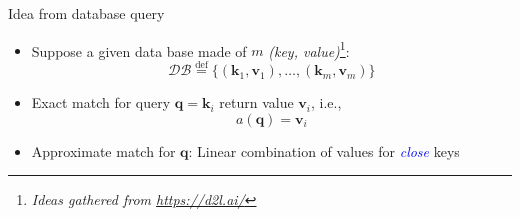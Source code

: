 \documentclass[pressentation,10pt,aspectratio=169,xcolor=table, colorlinks=true]{beamer}
\begin{document}
\begin{frame}[fragile]{Idea from database query}
  \begin{itemize}
  \item Suppose a given data base made of \(m\) \emph{(key, value)}\footnote{  \emph{Ideas gathered from \href{https://d2l.ai/chapter_attention-mechanisms-and-transformers/index.html}{https://d2l.ai/}}}:
    \[\mathcal{DB} \stackrel{\textrm{def}}{=} \big\{(\mathbf{k}_1, \mathbf{v}_1), \ldots, (\mathbf{k}_m, \mathbf{v}_m)\big\}\]

  \item Exact match for query \(\mathbf{q} = \mathbf{k}_i\) return value \(\mathbf{v}_i\), i.e.,
    \[a(\mathbf{q}) = \mathbf{v}_i\]

  \item<2-> Approximate match for \(\mathbf{q}\): Linear combination of values for \emph{\textcolor{blue}{close}} keys
  \end{itemize}

  
  
\end{frame}
\end{document}
